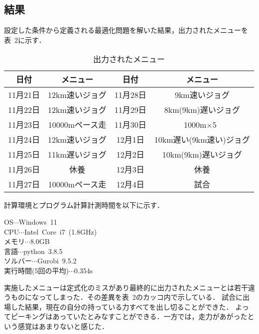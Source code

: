 \documentclass[12pt]{jarticle}
\begin{document}
\subsection{結果}
設定した条件から定義される最適化問題を解いた結果，出力されたメニューを表\ 2に示す．
\begin{longtable}{|c|c|c|c|}
  \caption{出力されたメニュー}                                   \\
  \hline
  日付     & メニュー       & 日付     & メニュー                \\
  \hline
  11月21日 & 12km速いジョグ & 11月28日 & 9km速いジョグ           \\
  \hline
  11月22日 & 12km速いジョグ & 11月29日 & 8km(9km)遅いジョグ      \\
  \hline
  11月23日 & 10000mペース走 & 11月30日 & 1000m$\times$5\         \\
  \hline
  11月24日 & 12km速いジョグ & 12月1日  & 10km遅い(9km速い)ジョグ \\
  \hline
  11月25日 & 11km遅いジョグ & 12月2日  & 10km(9km)遅いジョグ     \\
  \hline
  11月26日 & 休養           & 12月3日  & 休養                    \\
  \hline
  11月27日 & 10000mペース走 & 12月4日  & 試合                    \\
  \hline
\end{longtable}
計算環境とプログラム計算計測時間を以下に示す．
\begin{center}
  \begin{multicols}{2}
    \begin{description}
      \item[OS$\cdots$Windows\ 11]
      \item[CPU$\cdots$Intel\ Core\ i7\ (1.8GHz)]
      \item[メモリ$\cdots$8.0GB]
      \item[言語$\cdots$python\ 3.8.5]
      \item[ソルバー$\cdots$Gurobi\ 9.5.2]
      \item[ 実行時間(5回の平均)$\cdots$0.354s]
    \end{description}
  \end{multicols}
\end{center}
実施したメニューは定式化のミスがあり最終的に出力されたメニューとは若干違うものになってしまった．その差異を表\ 2のカッコ内で示している．
試合に出場した結果，現在の自分の持っている力すべてを出し切ることができた．
よってピーキングはあっていたとみなすことができる．一方では，走力があがったという感覚はあまりないと感じた．
\end{document}
